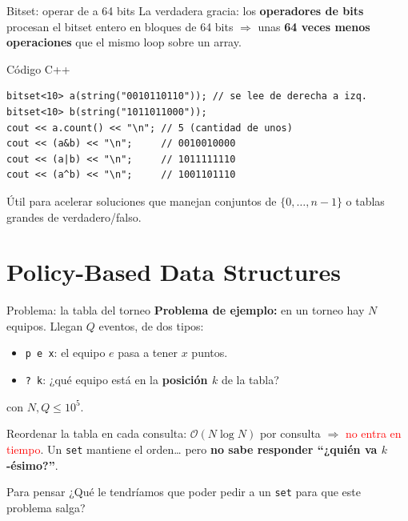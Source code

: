 \documentclass{beamer}
\begin{document}
\begin{frame}[fragile]{Bitset: operar de a 64 bits}
    La verdadera gracia: los \textbf{operadores de bits} procesan el bitset
    entero en bloques de 64 bits $\Rightarrow$ unas \textbf{64 veces menos
    operaciones} que el mismo loop sobre un array.
    \begin{block}{Código C++}
    \footnotesize
\begin{verbatim}
bitset<10> a(string("0010110110")); // se lee de derecha a izq.
bitset<10> b(string("1011011000"));
cout << a.count() << "\n"; // 5 (cantidad de unos)
cout << (a&b) << "\n";     // 0010010000
cout << (a|b) << "\n";     // 1011111110
cout << (a^b) << "\n";     // 1001101110
\end{verbatim}
    \end{block}

    \vspace{0.1cm}
    Útil para acelerar soluciones que manejan conjuntos de
    $\{0, \ldots, n-1\}$ o tablas grandes de verdadero/falso.
\end{frame}


\section{Policy-Based Data Structures}

\begin{frame}{Problema: la tabla del torneo}
    \textbf{Problema de ejemplo:} en un torneo hay $N$ equipos. Llegan $Q$
    eventos, de dos tipos:
    \begin{itemize}
        \item \texttt{p e x}: el equipo $e$ pasa a tener $x$ puntos.
        \item \texttt{?\ k}: ¿qué equipo está en la \textbf{posición $k$}
              de la tabla?
    \end{itemize}
    con $N, Q \leq 10^5$.

    \vspace{0.2cm}
    Reordenar la tabla en cada consulta: $\mathcal{O}(N \log N)$ por consulta
    $\Rightarrow$ \textcolor{red}{no entra en tiempo}. Un \texttt{set}
    mantiene el orden\ldots{} pero \textbf{no sabe responder ``¿quién va
    $k$-ésimo?''}.

    \vspace{0.3cm}
    \begin{alertblock}{Para pensar}
        \centering
        ¿Qué le tendríamos que poder pedir a un \texttt{set} para que
        este problema salga?
    \end{alertblock}
\end{frame}
\end{document}
